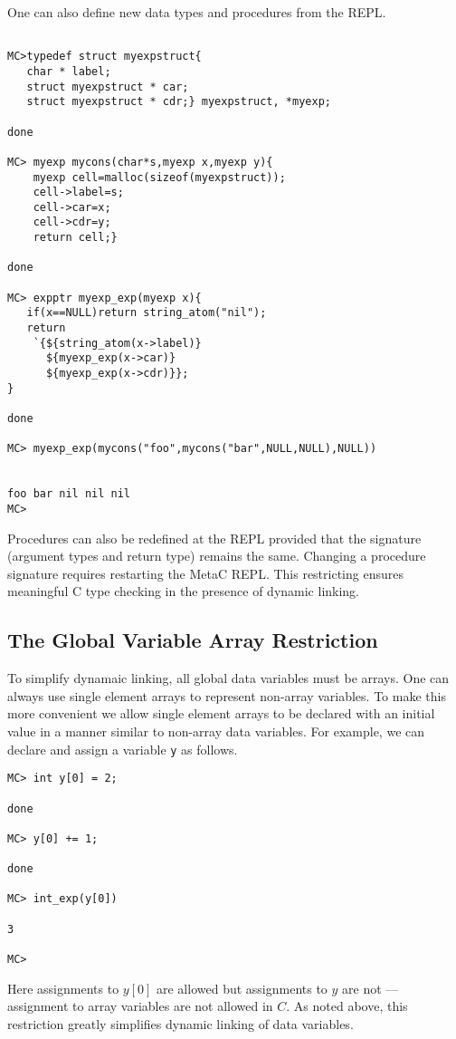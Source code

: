 \documentclass{article}
\begin{document}
One can also define new data types and procedures from the REPL.

\begin{verbatim}

MC>typedef struct myexpstruct{
   char * label;
   struct myexpstruct * car;
   struct myexpstruct * cdr;} myexpstruct, *myexp;

done

MC> myexp mycons(char*s,myexp x,myexp y){
    myexp cell=malloc(sizeof(myexpstruct));
    cell->label=s;
    cell->car=x;
    cell->cdr=y;
    return cell;}

done

MC> expptr myexp_exp(myexp x){
   if(x==NULL)return string_atom("nil");
   return
    `{${string_atom(x->label)}
      ${myexp_exp(x->car)}
      ${myexp_exp(x->cdr)}};
}

done

MC> myexp_exp(mycons("foo",mycons("bar",NULL,NULL),NULL))


foo bar nil nil nil
MC>
\end{verbatim}

Procedures can also be redefined at the REPL provided that the
signature (argument types and return type) remains the same. Changing a procedure signature
requires restarting the MetaC REPL.  This restricting ensures
meaningful C type checking in the presence of dynamic linking.

\subsection{The Global Variable Array Restriction}

To simplify dynamaic linking, all global data
variables must be arrays. One can always use single element
arrays to represent non-array variables.  To make this more convenient
we allow single element arrays to be declared with an initial value in a
manner similar to non-array data variables.  For example, we can declare and assign a variable {\tt y}
as follows.

\begin{verbatim}
MC> int y[0] = 2;

done

MC> y[0] += 1;

done

MC> int_exp(y[0])

3

MC>
\end{verbatim}

Here assignments to $y[0]$ are allowed but assignments to $y$ are not --- assignment to array variables
are not allowed in $C$. As noted above, this restriction greatly simplifies dynamic linking of data variables.
\end{document}
